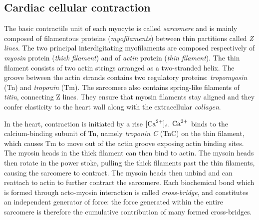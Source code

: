

%
%
%
\subsection{Cardiac cellular contraction}\label{sec:cardiaccellcontr}
The basic contractile unit of each myocyte is called \textit{sarcomere} and is mainly composed of filamentous proteins (\textit{myofilaments}) between thin partitions called \textit{Z lines}. The two principal interdigitating myofilaments are composed respectively of \textit{myosin} protein (\textit{thick filament}) and of \textit{actin} protein (\textit{thin filament}). The thin filament consists of two actin strings arranged as a two-stranded helix. The groove between the actin strands contains two regulatory proteins: \textit{tropomyosin} (\acs{Tn}) and \textit{troponin} (\acs{Tm}). The sarcomere also contains spring-like filaments of \textit{titin}, connecting Z lines. They ensure that myosin filaments stay aligned and they confer elasticity to the heart wall along with the extracellular \textit{collagen}. 

\vspace{0.2cm}
In the heart, contraction is initiated by a rise $[\textrm{Ca}^{2+}]_{i}$. $\textrm{Ca}^{2+}$ binds to the calcium-binding subunit of Tn, namely \textit{troponin C} (\acs{TnC}) on the thin filament, which causes Tm to move out of the actin groove exposing actin binding sites. The myosin heads in the thick filament can then bind to actin. The mysoin heads then rotate in the power stoke, pulling the thick filaments past the thin filaments, causing the sarcomere to contract. The mysoin heads then unbind and can reattach to actin to further contract the sarcomere. Each biochemical bond which is formed through acto-myosin interaction is called \textit{cross-bridge}, and constitutes an independent generator of force: the force generated within the entire sarcomere is therefore the cumulative contribution of many formed cross-bridges. 


